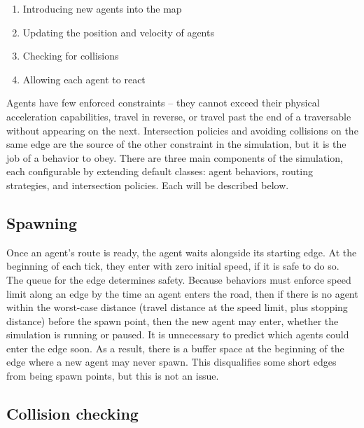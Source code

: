 \documentclass[letterpaper, 10 pt, conference]{ieeeconf}  %
\begin{document}
\begin{enumerate}
  \item Introducing new agents into the map
  \item Updating the position and velocity of agents
  \item Checking for collisions
  \item Allowing each agent to react
\end{enumerate}

Agents have few enforced constraints -- they cannot exceed their physical
acceleration capabilities, travel in reverse, or travel past the end of a
traversable without appearing on the next. Intersection policies and avoiding
collisions on the same edge are the source of the other constraint in the
simulation, but it is the job of a behavior to obey. There are three main
components of the simulation, each configurable by extending default classes:
agent behaviors, routing strategies, and intersection policies. Each will be
described below.


\subsection{Spawning}


Once an agent's route is ready, the agent waits alongside its starting edge. At
the beginning of each tick, they enter with zero initial speed, if it is safe to
do so. The queue for the edge determines safety. Because behaviors must enforce
speed limit along an edge by the time an agent enters the road, then if there is
no agent within the worst-case distance (travel distance at the speed limit,
plus stopping distance) before the spawn point, then the new agent may enter,
whether the simulation is running or paused. It is unnecessary to predict which
agents could enter the edge soon. As a result, there is a buffer space at the
beginning of the edge where a new agent may never spawn. This disqualifies some
short edges from being spawn points, but this is not an issue.

\subsection{Collision checking}
\end{document}
